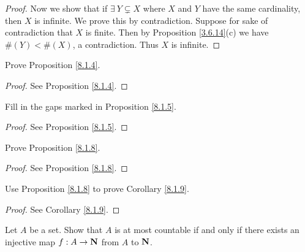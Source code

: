\begin{proof}
    Now we show that if \(\exists\ Y \subsetneq X\) where \(X\) and \(Y\) have the same cardinality, then \(X\) is infinite.
    We prove this by contradiction.
    Suppose for sake of contradiction that \(X\) is finite.
    Then by Proposition \ref{3.6.14}(c) we have \(\#(Y) < \#(X)\), a contradiction.
    Thus \(X\) is infinite.
\end{proof}

\begin{exercise}\label{ex 8.1.2}
    Prove Proposition \ref{8.1.4}.
\end{exercise}

\begin{proof}
    See Proposition \ref{8.1.4}.
\end{proof}

\begin{exercise}\label{ex 8.1.3}
    Fill in the gaps marked in Proposition \ref{8.1.5}.
\end{exercise}

\begin{proof}
    See Proposition \ref{8.1.5}.
\end{proof}

\begin{exercise}\label{ex 8.1.4}
    Prove Proposition \ref{8.1.8}.
\end{exercise}

\begin{proof}
    See Proposition \ref{8.1.8}.
\end{proof}

\begin{exercise}\label{ex 8.1.5}
    Use Proposition \ref{8.1.8} to prove Corollary \ref{8.1.9}.
\end{exercise}

\begin{proof}
    See Corollary \ref{8.1.9}.
\end{proof}

\begin{exercise}\label{ex 8.1.6}
    Let \(A\) be a set.
    Show that \(A\) is at most countable if and only if there exists an injective map \(f : A \to \mathbf{N}\) from \(A\) to \(\mathbf{N}\).
\end{exercise}

